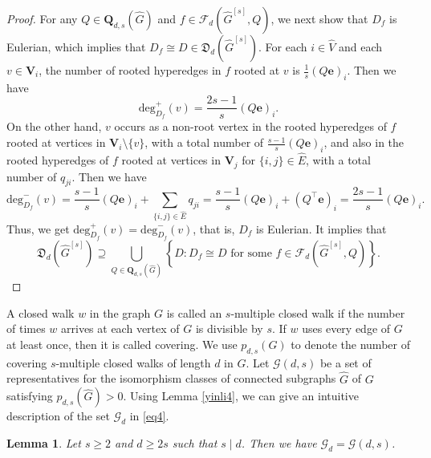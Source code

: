 \documentclass{article}
\newtheorem{lem}[thm]{Lemma}
\begin{document}
\begin{proof}
For any $Q \in \mathbf{Q}_{d,s}(\widehat{G})$ and $f \in \mathcal{F}_{d}(\widehat{G}^{[s]},Q)$,
we next show that $D_{f}$ is Eulerian,
which implies that $D_{f} \cong D \in \mathfrak{D}_{d}(\widehat{G}^{[s]})$.
For each $i \in \widehat{V}$ and each $v \in \mathbf{V}_{i}$,
the number of rooted hyperedges in $f$ rooted at $v$ is $\frac{1}{s}(Q\mathbf{e})_{i}$.
Then we have $$\mathrm{deg}_{D_{f}}^{+}(v)=\frac{2s-1}{s}(Q\mathbf{e})_{i}.$$
On the other hand,
$v$ occurs as a non-root vertex in the rooted hyperedges of $f$ rooted at vertices in $\mathbf{V}_{i} \setminus \{v\}$,
with a total number of $\frac{s-1}{s}(Q\mathbf{e})_{i}$,
and also in the rooted hyperedges of $f$ rooted at vertices in $\mathbf{V}_{j}$ for $\{i,j\} \in \widehat{E}$,
with a total number of $q_{ji}$.
Then we have $$\mathrm{deg}_{D_{f}}^{-}(v)=\frac{s-1}{s}(Q\mathbf{e})_{i}+\sum_{\{i,j\} \in \widehat{E}}q_{ji}
=\frac{s-1}{s}(Q\mathbf{e})_{i}+\left(Q^{\top}\mathbf{e}\right)_{i}
=\frac{2s-1}{s}(Q\mathbf{e})_{i}.$$
Thus,
we get $\mathrm{deg}_{D_{f}}^{+}(v)=\mathrm{deg}_{D_{f}}^{-}(v)$,
that is, $D_{f}$ is Eulerian.
It implies that $$\mathfrak{D}_{d}(\widehat{G}^{[s]})\supseteq
\bigcup_{Q \in \mathbf{Q}_{d,s}(\widehat{G})}\left\{ D : \mbox{$D_{f} \cong D$ for some $f \in \mathcal{F}_{d}(\widehat{G}^{[s]},Q)$} \right\}.$$
\end{proof}

A closed walk $w$ in the graph $G$ is called an $s$-multiple closed walk if the number of times $w$ arrives at each vertex of $G$ is divisible by $s$.
If $w$ uses every edge of $G$ at least once,
then it is called covering.
We use $p_{d,s}(G)$ to denote the number of covering $s$-multiple closed walks of length $d$ in $G$.
Let $\mathcal{G}(d,s)$ be a set of representatives for the isomorphism classes of connected subgraphs $\widehat{G}$ of $G$ satisfying $p_{d,s}(\widehat{G})>0$.
Using Lemma \ref{yinli4},
we can give an intuitive description of the set $\mathcal{G}_d$ in \eqref{eq4}.

\begin{lem}\label{yinli5}
Let $s \geq 2$ and $d \geq 2s$ such that $s \mid d$.
Then we have $\mathcal{G}_{d}=\mathcal{G}(d,s)$.
\end{lem}
\end{document}
